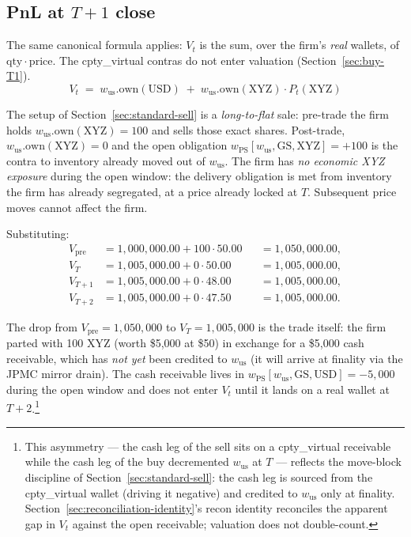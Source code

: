 \documentclass[11pt,a4paper]{article}
\begin{document}
\subsection{PnL at $T+1$ close}

The same canonical formula applies: $V_t$ is the sum, over the firm's \emph{real} wallets, of $\mathrm{qty} \cdot \mathrm{price}$. The cpty\_virtual contras do not enter valuation (Section~\ref{sec:buy-T1}).
\[
\boxed{\;V_t \;=\; w_{\mathrm{us}}.\mathrm{own}(\mathrm{USD}) \;+\; w_{\mathrm{us}}.\mathrm{own}(\mathrm{XYZ}) \cdot P_t(\mathrm{XYZ})\;}
\]

The setup of Section~\ref{sec:standard-sell} is a \emph{long-to-flat} sale: pre-trade the firm holds $w_{\mathrm{us}}.\mathrm{own}(\mathrm{XYZ}) = 100$ and sells those exact shares. Post-trade, $w_{\mathrm{us}}.\mathrm{own}(\mathrm{XYZ}) = 0$ and the open obligation $w_{\mathrm{PS}}[w_{\mathrm{us}}, \mathrm{GS}, \mathrm{XYZ}] = +100$ is the contra to inventory already moved out of $w_{\mathrm{us}}$. The firm has \emph{no economic XYZ exposure} during the open window: the delivery obligation is met from inventory the firm has already segregated, at a price already locked at $T$. Subsequent price moves cannot affect the firm.

Substituting:
\begin{align*}
V_{\mathrm{pre}} &= 1{,}000{,}000.00 + 100 \cdot 50.00 &&= 1{,}050{,}000.00, \\
V_T              &= 1{,}005{,}000.00 + 0   \cdot 50.00 &&= 1{,}005{,}000.00, \\
V_{T+1}          &= 1{,}005{,}000.00 + 0   \cdot 48.00 &&= 1{,}005{,}000.00, \\
V_{T+2}          &= 1{,}005{,}000.00 + 0   \cdot 47.50 &&= 1{,}005{,}000.00.
\end{align*}

The drop from $V_{\mathrm{pre}} = 1{,}050{,}000$ to $V_T = 1{,}005{,}000$ is the trade itself: the firm parted with 100 XYZ (worth \$5{,}000 at \$50) in exchange for a \$5{,}000 cash receivable, which has \emph{not yet} been credited to $w_{\mathrm{us}}$ (it will arrive at finality via the JPMC mirror drain). The cash receivable lives in $w_{\mathrm{PS}}[w_{\mathrm{us}}, \mathrm{GS}, \mathrm{USD}] = -5{,}000$ during the open window and does not enter $V_t$ until it lands on a real wallet at $T+2$.\footnote{This asymmetry --- the cash leg of the sell sits on a cpty\_virtual receivable while the cash leg of the buy decremented $w_{\mathrm{us}}$ at $T$ --- reflects the move-block discipline of Section~\ref{sec:standard-sell}: the cash leg is sourced from the cpty\_virtual wallet (driving it negative) and credited to $w_{\mathrm{us}}$ only at finality. Section~\ref{sec:reconciliation-identity}'s recon identity reconciles the apparent gap in $V_t$ against the open receivable; valuation does not double-count.}
\end{document}
